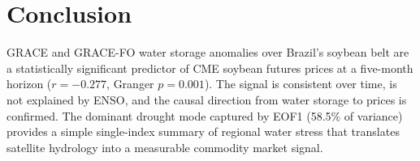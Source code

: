 \documentclass[10pt, twocolumn]{article}
\begin{document}
\section*{Conclusion}

GRACE and GRACE-FO water storage anomalies over Brazil's soybean
belt are a statistically significant predictor of CME soybean
futures prices at a five-month horizon ($r = -0.277$,
Granger $p = 0.001$). The signal is consistent over time, is not
explained by ENSO, and the causal direction from water storage to
prices is confirmed. The dominant drought mode captured by EOF1
(58.5\% of variance) provides a simple single-index summary of
regional water stress that translates satellite hydrology into
a measurable commodity market signal.

\newpage
\nocite{*}
\printbibliography[heading=bibintoc, title={References}]
\end{document}
